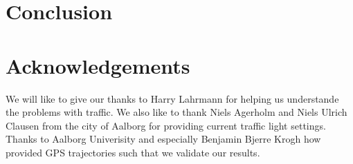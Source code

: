 \section{Conclusion}\label{sec:Conclusion}









\section{Acknowledgements}
We will like to give our thanks to Harry Lahrmann for helping us understande the problems with traffic.
We also like to thank Niels Agerholm and Niels Ulrich Clausen from the city of Aalborg for providing current traffic light settings.
Thanks to Aalborg Univerisity and especially Benjamin Bjerre Krogh how provided GPS trajectories such that we validate our results.




